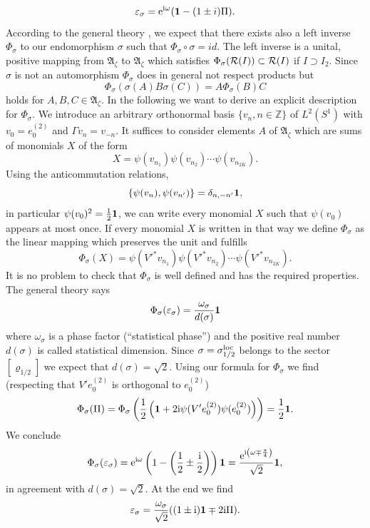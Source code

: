 \documentclass[10pt,a4paper]{article}
\begin{document}
\[ \varepsilon_\sigma = {\rm e}^{{\rm i}\omega} ({\bf 1}
-(1\pm i)\Pi). \]
According to the general theory
\cite{DHR2,FRS1,Haag}, we expect that there
exists also a left inverse $\Phi_\sigma$ to our
endomorphism $\sigma$ such that $\Phi_\sigma\circ
\sigma=id$. The left inverse is a unital, positive
mapping from $\mathfrak{A}_\zeta$ to
$\mathfrak{A}_\zeta$ which satisfies
$\Phi_\sigma({\cal R}(I))\subset {\cal R}(I)$ if
$I\supset I_2$. Since $\sigma$ is not an automorphism
$\Phi_\sigma$ does in general not respect products but
\[ \Phi_\sigma(\sigma(A)B\sigma(C))=A\Phi_\sigma(B)C \]
holds for $A,B,C\in\mathfrak{A}_\zeta$. In the following
we want to derive an explicit description for
$\Phi_\sigma$. We introduce an arbitrary orthonormal
basis $\{ v_n,n\in\mathbb{Z}\}$ of $L^2(S^1)$ with
$v_0=e_0^{(2)}$ and $\Gamma v_n = v_{-n}$.
It suffices to consider elements $A$ of $\mathfrak{A}_\zeta$
which are sums of monomials $X$ of the form
\[ X=\psi(v_{n_1}) \psi(v_{n_2}) \cdots
\psi(v_{n_{2K}}). \]
Using the anticommutation relations,
\[ \{ \psi(v_n),\psi(v_{n'})\}=\delta_{n,-n'}{\bf 1},\]
in particular $\psi(v_0)^2=\frac{1}{2}{\bf 1}$,
we can write every monomial $X$ such that $\psi(v_0)$
appears at most once. If every monomial $X$ is written
in that way we define $\Phi_\sigma$ as the linear mapping
which preserves the unit and fulfills
\[ \Phi_\sigma(X) = \psi({V'}^*v_{n_1})\psi({V'}^*v_{n_2})
\cdots \psi({V'}^*v_{n_{2K}}). \]
It is no problem to check that $\Phi_\sigma$ is well
defined and has the required properties. The general
theory says
\[ \Phi_\sigma (\varepsilon_\sigma) = \frac{\omega_\sigma}
{d(\sigma)} {\bf 1} \]
where $\omega_\sigma$ is a phase factor (``statistical
phase'') and the positive real number $d(\sigma)$ is
called statistical dimension. Since
$\sigma=\sigma_{1/2}^{\rm loc}$ belongs to the
sector $[\varrho_{1/2}]$ we expect that
$d(\sigma)=\sqrt{2}$. Using our formula
for $\Phi_\sigma$ we find (respecting that
$V'e_0^{(2)}$ is orthogonal to $e_0^{(2)}$)
\[ \Phi_\sigma(\Pi) = \Phi_\sigma \left(
\frac{1}{2} \left({\bf 1} + 2{\rm i} \psi
(V'e_0^{(2)})\psi(e_0^{(2)})
\right)\right) = \frac{1}{2}{\bf 1}. \]
We conclude
\[ \Phi_\sigma(\varepsilon_\sigma)= {\rm e}^{{\rm i}\omega}
\left( 1- \left( \frac{1}{2} \pm \frac{{\rm i}}{2}
\right)\right) {\bf 1} = \frac{{\rm e}^{{\rm i}\left(\omega
\mp \frac{\pi}{4} \right)}}{\sqrt{2}} {\bf 1}, \]
in agreement with $d(\sigma)=\sqrt{2}$. At the end
we find
\begin{equation}
\varepsilon_\sigma= \frac{\omega_\sigma}{\sqrt{2}}
((1\pm {\rm i}){\bf 1} \mp 2{\rm i} \Pi).
\end{equation}
\end{document}
